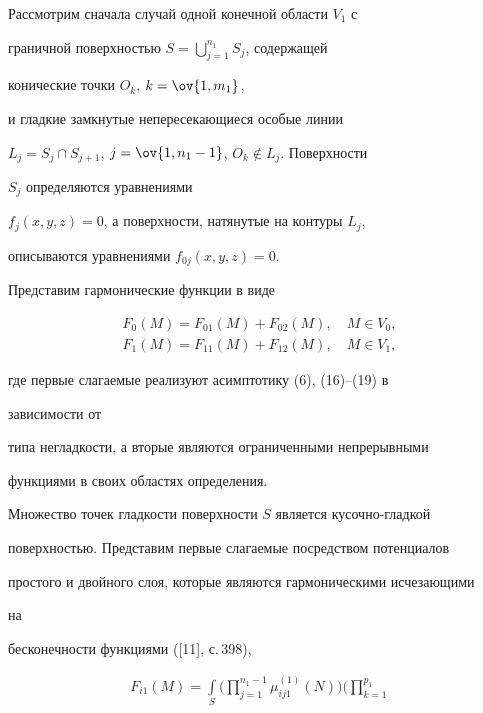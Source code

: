 \begin{pf} 


Рассмотрим сначала случай одной конечной области $V_1$ с 


граничной поверхностью $S=\bigcup\limits^{n_1}_{j=1}S_j$, содержащей 


конические точки $O_k$, $k=\ov{1,m_1}$, 


и гладкие замкнутые непересекающиеся особые линии 


$L_j=S_j\cap S_{j+1}$, $j=\ov{1,n_1-1}$, $O_k\notin L_j$. Поверхности 


$S_j$ определяются уравнениями  


$f_j(x,y,z)=0$, а поверхности, натянутые на контуры $L_j$,


описываются уравнениями $f_{0j}(x,y,z)=0$. 


 


Представим гармонические функции в виде 


\begin{gather} 


F_0(M)=F_{01}(M)+F_{02}(M),\quad M\in V_0, \\ 


F_1(M)=F_{11}(M)+F_{12}(M),\quad M\in V_1, 


\end{gather} 


где первые слагаемые реализуют асимптотику (6), (16)--(19) в 


зависимости от  


типа негладкости, а вторые являются ограниченными непрерывными  


функциями в своих областях определения. 


 


Множество точек гладкости поверхности $S$ является кусочно-гладкой  


поверхностью. Представим первые слагаемые посредством потенциалов 


простого и двойного слоя, которые являются гармоническими исчезающими 


на 


бесконечности функциями ([11], с.\,398), 


\begin{multline} 


F_{i1}(M)=\int\limits_S\bigg(\prod^{n_1-1}_{j=1} 


\mu^{(1)}_{i j 1}(N)\bigg)\bigg(\prod^{p_1}_{k=1} 



\end{multline}
\end{pf}
